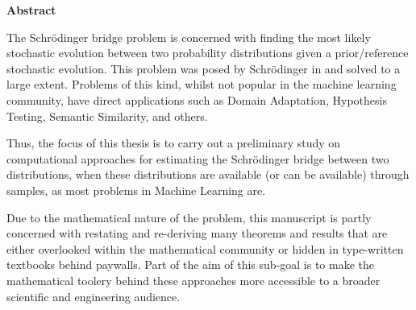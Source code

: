 \newpage
{\Huge \bf Abstract}
\vspace{24pt} 


The Schrödinger bridge problem is concerned with finding the most likely stochastic evolution between two probability distributions given a prior/reference stochastic evolution. This problem was posed by Schrödinger in \cite{schrodinger1931uber,schrodinger1932theorie} and solved to a large extent. Problems of this kind, whilst not popular in the machine learning community, have direct applications such as Domain Adaptation, Hypothesis Testing, Semantic Similarity, and others.

Thus, the focus of this thesis is to carry out a preliminary study on computational approaches for estimating the Schrödinger bridge between two distributions, when these distributions are available (or can be available) through samples, as most problems in Machine Learning are.

Due to the mathematical nature of the problem, this manuscript is partly concerned with restating and re-deriving many theorems and results that are either overlooked within the mathematical community or hidden in type-written textbooks behind paywalls. Part of the aim of this sub-goal is to make the mathematical toolery behind these approaches more accessible to a broader scientific and engineering audience.

\newpage
\vspace*{\fill}
